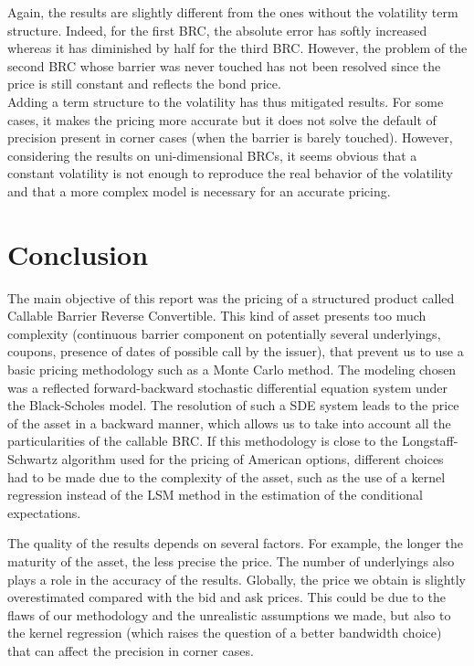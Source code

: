 \documentclass[a4paper,11pt,english]{book}
\begin{document}
\newpage
Again, the results are slightly different from the ones without the volatility term structure. Indeed, for the first BRC, the absolute error has softly increased whereas it has diminished by half for the third BRC. However, the problem of the second BRC whose barrier was never touched has not been resolved since the price is still constant and reflects the bond price.\\

Adding a term structure to the volatility has thus mitigated results. For some cases, it makes the pricing more accurate but it does not solve the default of precision present in corner cases (when the barrier is barely touched). However, considering the results on uni-dimensional BRCs, it seems obvious that a constant volatility is not enough to reproduce the real behavior of the volatility and that a more complex model is necessary for an accurate pricing. 

\backmatter
\chapter*{Conclusion}
The main objective of this report was the pricing of a structured product called Callable Barrier Reverse Convertible. This kind of asset presents too much complexity (continuous barrier component on potentially several underlyings, coupons, presence of dates of possible call by the issuer), that prevent us to use a basic pricing methodology such as a Monte Carlo method. The modeling chosen was a reflected forward-backward stochastic differential equation system under the Black-Scholes model. The resolution of such a SDE system leads to the price of the asset in a backward manner, which allows us to take into account all the particularities of the callable BRC. If this methodology is close to the Longstaff-Schwartz algorithm used for the pricing of American options, different choices had to be made due to the complexity of the asset, such as the use of a kernel regression instead of the LSM method in the estimation of the conditional expectations.

The quality of the results depends on several factors. For example, the longer the maturity of the asset, the less precise the price. The number of underlyings also plays a role in the accuracy of the results. Globally, the price we obtain is slightly overestimated compared with the bid and ask prices. This could be due to the flaws of our methodology and the unrealistic assumptions we made, but also to the kernel regression (which raises the question of a better bandwidth choice) that can affect the precision in corner cases.
\end{document}
